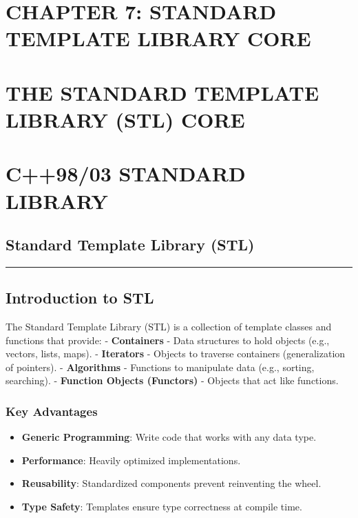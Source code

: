 \hypertarget{chapter-7-standard-template-library-core}{%
\section{CHAPTER 7: STANDARD TEMPLATE LIBRARY
CORE}\label{chapter-7-standard-template-library-core}}

\hypertarget{the-standard-template-library-stl-core}{%
\section{THE STANDARD TEMPLATE LIBRARY (STL)
CORE}\label{the-standard-template-library-stl-core}}

\hypertarget{c9803-standard-library}{%
\section{C++98/03 STANDARD LIBRARY}\label{c9803-standard-library}}

\hypertarget{standard-template-library-stl}{%
\subsection{Standard Template Library
(STL)}\label{standard-template-library-stl}}

\begin{center}\rule{0.5\linewidth}{0.5pt}\end{center}

\hypertarget{introduction-to-stl}{%
\subsection{Introduction to STL}\label{introduction-to-stl}}

The Standard Template Library (STL) is a collection of template classes
and functions that provide: - \textbf{Containers} - Data structures to
hold objects (e.g., vectors, lists, maps). - \textbf{Iterators} -
Objects to traverse containers (generalization of pointers). -
\textbf{Algorithms} - Functions to manipulate data (e.g., sorting,
searching). - \textbf{Function Objects (Functors)} - Objects that act
like functions.

\hypertarget{key-advantages}{%
\subsubsection{Key Advantages}\label{key-advantages}}

\begin{itemize}
\tightlist
\item
  \textbf{Generic Programming}: Write code that works with any data
  type.
\item
  \textbf{Performance}: Heavily optimized implementations.
\item
  \textbf{Reusability}: Standardized components prevent reinventing the
  wheel.
\item
  \textbf{Type Safety}: Templates ensure type correctness at compile
  time.
\end{itemize}

